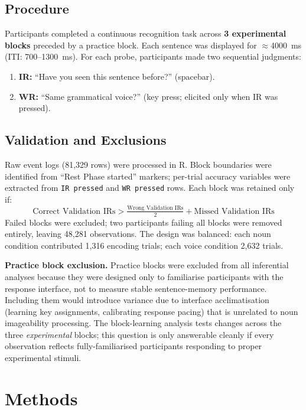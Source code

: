 \documentclass[12pt, a4paper]{article}
\begin{document}
\subsection{Procedure}

Participants completed a continuous recognition task across
\textbf{3 experimental blocks} preceded by a practice block. Each
sentence was displayed for $\approx$4000~ms (ITI: 700--1300~ms). For
each probe, participants made two sequential judgments:
\begin{enumerate}[nosep]
  \item \textbf{IR:} ``Have you seen this sentence before?'' (spacebar).
  \item \textbf{WR:} ``Same grammatical voice?'' (key press; elicited
  only when IR was pressed).
\end{enumerate}

\subsection{Validation and Exclusions}

Raw event logs (81,329 rows) were processed in R. Block boundaries were
identified from ``Rest Phase started'' markers; per-trial accuracy
variables were extracted from \texttt{IR pressed} and \texttt{WR pressed}
rows. Each block was retained only if:
\[
  \text{Correct Validation IRs} >
  \tfrac{\text{Wrong Validation IRs}}{2} + \text{Missed Validation IRs}
\]
Failed blocks were excluded; two participants failing all blocks were
removed entirely, leaving 48,281 observations. The design was balanced:
each noun condition contributed 1,316 encoding trials; each voice
condition 2,632 trials.

\textbf{Practice block exclusion.} Practice blocks were excluded from all
inferential analyses because they were designed only to familiarise
participants with the response interface, not to measure stable
sentence-memory performance. Including them would introduce variance due
to interface acclimatisation (learning key assignments, calibrating
response pacing) that is unrelated to noun imageability processing.
The block-learning analysis tests changes across the three
\emph{experimental} blocks; this question is only answerable cleanly
if every observation reflects fully-familiarised participants responding
to proper experimental stimuli.

\section{Methods}
\end{document}
